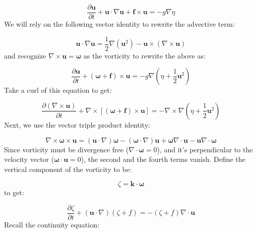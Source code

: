 \documentclass[12pt]{article}
\numberwithin{equation}{section}
\numberwithin{figure}{section}
\numberwithin{table}{section}
\begin{document}
\begin{equation}
  \frac{\partial \mathbf{u}}{\partial t} +
  \mathbf{u} \cdot \nabla \mathbf{u} +
  \mathbf{f} \times \mathbf{u} =
  - g \nabla \eta
\end{equation}
We will rely on the following vector identity to rewrite the advective term:

\begin{equation}
  \mathbf{u} \cdot \nabla \mathbf{u} =
  \frac{1}{2} \nabla (\mathbf{u}^2) -
  \mathbf{u} \times (\nabla \times \mathbf{u})
\end{equation}
and recognize $\nabla \times \mathbf{u} = \boldsymbol{\omega}$ as the vorticity
to rewrite the above as:

\begin{equation}
  \frac{\partial \mathbf{u}}{\partial t} +
  \left(\boldsymbol{\omega} + \mathbf{f}\right) \times \mathbf{u} =
  - g \nabla \left(\eta + \frac{1}{2} \mathbf{u}^2 \right)
\end{equation}
Take a curl of this equation to get:

\begin{equation}
  \frac{\partial (\nabla \times \mathbf{u})}{\partial t} +
  \nabla \times \left[(\boldsymbol{\omega} + \mathbf{f}) \times \mathbf{u}\right] =
  - \nabla \times \nabla \left(\eta + \frac{1}{2} \mathbf{u}^2 \right)
\end{equation}
Next, we use the vector triple product identity:

\begin{equation}
  \nabla \times \boldsymbol{\omega} \times \mathbf{u} =
  (\mathbf{u} \cdot \nabla) \boldsymbol{\omega} -
  (\boldsymbol{\omega} \cdot \nabla) \mathbf{u} +
  \boldsymbol{\omega} \nabla \cdot \mathbf{u} -
  \mathbf{u} \nabla \cdot \boldsymbol{\omega}
\end{equation}
Since vorticity must be divergence free ($\nabla \cdot \boldsymbol{\omega} = 0$),
and it's perpendicular to the velocity vector ($\boldsymbol{\omega} \cdot \mathbf{u} = 0$),
the second and the fourth terms vanish.
Define the vertical component of the vorticity to be:

\begin{equation}
  \zeta = \mathbf{k} \cdot \boldsymbol{\omega}
\end{equation}
to get:

\begin{equation}
  \frac{\partial \zeta}{\partial t} +
  \left(\mathbf{u} \cdot \nabla \right) \left(\zeta + f\right) =
  - \left(\zeta + f\right) \nabla \cdot \mathbf{u}
\end{equation}
Recall the continuity equation:
\end{document}
